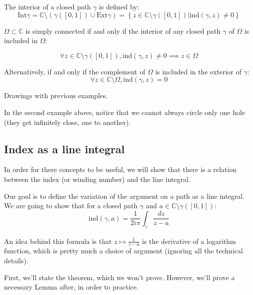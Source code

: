 \begin{defi}
    The interior of a closed path $\gamma$ is defined by:
    $$ \mathrm{Int}\gamma = \mathbb{C} \setminus \left( \gamma([0,1]) \cup \mathrm{Ext}\gamma\right ) = \left\lbrace z \in \mathbb{C} \setminus \gamma([0,1]) \bigg\vert  \mathrm{ind}(\gamma, z) \neq 0 \right\rbrace$$
\end{defi}


\begin{thm*}
    $\Omega\subset\mathbb{C}$ is simply connected if and only if the interior of any closed path $\gamma$ of $\Omega$ is included in $\Omega$:

    $$\forall z \in \mathbb{C}\setminus\gamma([0,1]), \mathrm{ind}(\gamma, z) \neq 0 \implies z \in \Omega $$

Alternatively, if and only if the complement of $\Omega$ is included in the exterior of $\gamma$:
$$\forall z \in \mathbb{C}\setminus\Omega, \mathrm{ind}(\gamma, z) = 0$$
\end{thm*}

\begin{example}
    Drawings with previous examples.
\end{example}

\begin{note}
    In the second example above, notice that we cannot always circle only one hole (they get infinitely close, one to another).
\end{note}

\subsection{Index as a line integral}
In order for there concepts to be useful, we will show that there is a relation between the index (or winding number) and the line integral.

Our goal is to define the variation of the argument on a path as a line integral. We are going to show that for a closed path $\gamma$ and $a\in\mathbb{C}\setminus\gamma([0,1])$:
$$\mathrm{ind}(\gamma, a) = \frac{1}{2i\pi}\int_\gamma\frac{dz}{z - a}$$

An idea behind this formula is that $z \mapsto \frac{1}{z - a}$ is the derivative of a logarithm function, which is pretty much a choice of argument (ignoring all the technical details).

First, we'll state the theorem, which we won't prove. However, we'll prove a necessary Lemma after, in order to practice.


